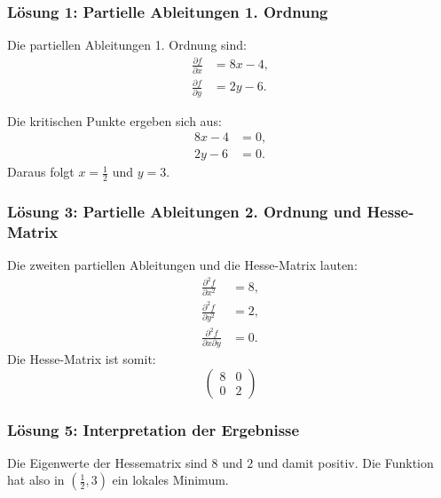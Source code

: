 \documentclass{beamer}
\begin{document}
\begin{frame}
    \frametitle{Lösung 1: Partielle Ableitungen 1. Ordnung}
    Die partiellen Ableitungen 1. Ordnung sind:
    \begin{align*}
        \frac{\partial f}{\partial x} &= 8x - 4, \\
        \frac{\partial f}{\partial y} &= 2y - 6.
    \end{align*}

    Die kritischen Punkte ergeben sich aus:
    \begin{align*}
        8x - 4 &= 0, \\
        2y - 6 &= 0.
    \end{align*}
    Daraus folgt \( x = \frac{1}{2} \) und \( y = 3 \).
\end{frame}

\begin{frame}
    \frametitle{Lösung 3: Partielle Ableitungen 2. Ordnung und Hesse-Matrix}
    Die zweiten partiellen Ableitungen und die Hesse-Matrix lauten:
    \begin{align*}
        \frac{\partial^2 f}{\partial x^2} &= 8, \\
        \frac{\partial^2 f}{\partial y^2} &= 2, \\
        \frac{\partial^2 f}{\partial x \partial y} &= 0.
    \end{align*}
    Die Hesse-Matrix ist somit:
    \[
    \begin{pmatrix}
        8 & 0 \\
        0 & 2
    \end{pmatrix}
    \]


    \frametitle{Lösung 5: Interpretation der Ergebnisse}
  Die Eigenwerte der Hessematrix sind $8$ und $2$ und damit positiv. Die Funktion hat also in $(\frac{1}{2}, 3)$ ein lokales Minimum. 
\end{frame}
\end{document}

